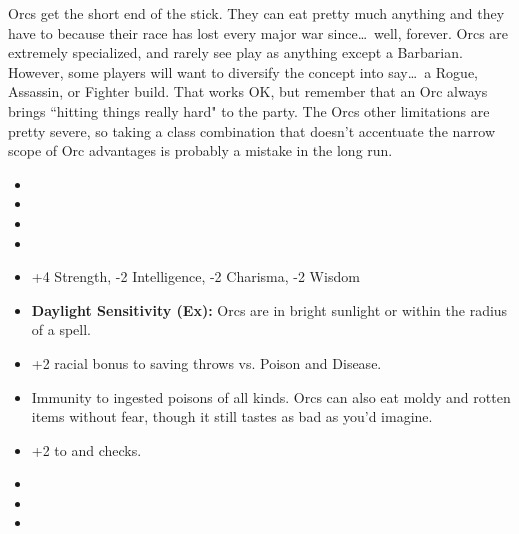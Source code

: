 \vspace*{-8pt}

Orcs get the short end of the stick. They can eat pretty much anything and they have to because their race has lost every major war since\ldots\ well, forever. Orcs are extremely specialized, and rarely see play as anything except a Barbarian. However, some players will want to diversify the concept into say\ldots\  a Rogue, Assassin, or Fighter build. That works OK, but remember that an Orc always brings ``hitting things really hard" to the party. The Orcs other limitations are pretty severe, so taking a class combination that doesn't accentuate the narrow scope of Orc advantages is probably a mistake in the long run.

\begin{itemize}
\item {}
\item {}
\item {}
\item {}
\item +4 Strength, -2 Intelligence, -2 Charisma, -2 Wisdom
\item \textbf{Daylight Sensitivity (Ex):} Orcs are  in bright sunlight or within the radius of a  spell.
\item +2 racial bonus to saving throws vs. Poison and Disease.
\item Immunity to ingested poisons of all kinds. Orcs can also eat moldy and rotten items without fear, though it still tastes as bad as you'd imagine.
\item +2 to  and  checks.
\item {}
\item {}
\item {}
\end{itemize}


